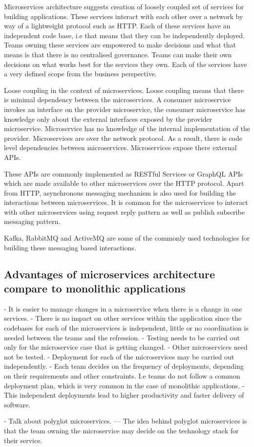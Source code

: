 \documentclass[a4paper, 11pt]{book}
\begin{document}
    Microservices architecture suggests creation of loosely coupled set of services for building applications.
    These services interact with each other over a network by way of a lightweight protocol such as HTTP\@.
    Each of these services have an independent code base, i.e that means that they can be independently deployed.
    Teams owning these services are empowered to make decisions and what that means is that there is no centralised governance.
    Teams can make their own decisions on what works best for the services they own.
    Each of the services have a very defined scope from the business perspective.

    Loose coupling in the context of microservices.
    Loose coupling means that there is minimal dependency between the microservices.
    A consumer microservice invokes an interface on the provider microservice, the consumer microservice has knowledge only about the external interfaces exposed by the provider microservice.
    Microservice has no knowledge of the internal implementation of the provider.
    Microservices are over the network protocol.
    As a result, there is code level dependencies between microservices.
    Microservices expose there external APIs.

    These APIs are commonly implemented as RESTful Services or GraphQL APIs which are made available to other microservices over the HTTP protocol.
    Apart from HTTP, asynchronous messaging mechanism is also used for building the interactions between microservices.
    It is common for the microservices to interact with other microservices using request reply pattern as well as publish subscribe messaging pattern.

    Kafka, RabbitMQ and ActiveMQ are some of the commonly used technologies for building these messaging based interactions.

    \subsection{Advantages of microservices architecture compare to monolithic applications}
    \begin{itemize}
    - It is easier to manage changes in a microservice when there is a change in one services.
    - There is no impact on other services within the application since the codebases for each of the microservices is independent, little or no coordination is needed between the teams and the refression.
    - Testing needs to be carried out only for the microservice case that is getting changed.
    - Other microservices need not be tested.
    - Deployment for each of the microservices may be carried out independently.
    - Each team decides on the frequency of deployments, depending on their requirements and other constraints. I.e teams do not follow a common deployment plan, which is very common in the case of monolithic applications.
    - This independent deployments lead to higher productivity and faster delivery of software.
    \end{itemize}
    - Talk about polyglot microservices.
    --- The idea behind polyglot microservices is that the team owning the microservice may decide on the technology stack for their service.
\end{document}
